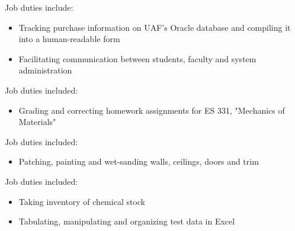 \documentclass{resume}
\begin{document}
Job duties include:
\small\begin{itemize}
\item Tracking purchase information on UAF's Oracle database and compiling it
into a human-readable form
\item Facilitating communication between students, faculty and system
administration
\end{itemize}\normalsize\medskip

Job duties included:
\small\begin{itemize}
\item Grading and correcting homework assignments for ES 331, "Mechanics of Materials"
\end{itemize}\normalsize\medskip

Job duties included:
\small\begin{itemize}
\item Patching, painting and wet-sanding walls, ceilings, doors and trim
\end{itemize}\normalsize\medskip


Job duties included:
\small\begin{itemize}
\item Taking inventory of chemical stock
\item Tabulating, manipulating and organizing test data in Excel
\end{itemize}\normalsize\medskip

\end{document}
